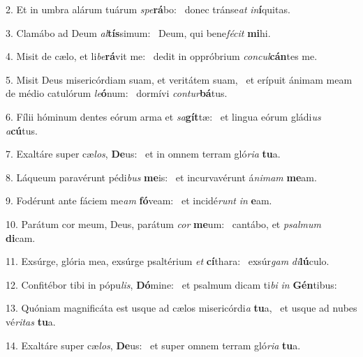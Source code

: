 2. Et in umbra alárum tuárum \textit{spe}\textbf{rá}bo: \ast\  donec tránse\textit{at} \textit{in}\textbf{í}quitas.\

3. Clamábo ad Deum \textit{al}\textbf{tís}simum: \ast\  Deum, qui bene\textit{fé}\textit{cit} \textbf{mi}hi.\

4. Misit de cælo, et li\textit{be}\textbf{rá}vit me: \ast\  dedit in oppróbrium \textit{con}\textit{cul}\textbf{cán}tes me.\

5. Misit Deus misericórdiam suam, et veritátem suam, \dag\  et erípuit ánimam meam de médio catulórum \textit{le}\textbf{ó}num: \ast\  dormívi \textit{con}\textit{tur}\textbf{bá}tus.\

6. Fílii hóminum dentes eórum arma et \textit{sa}\textbf{gít}tæ: \ast\  et lingua eórum gládi\textit{us} \textit{a}\textbf{cú}tus.\

7. Exaltáre super cæ\textit{los}, \textbf{De}us: \ast\  et in omnem terram gló\textit{ri}\textit{a} \textbf{tu}a.\

8. Láqueum paravérunt pédi\textit{bus} \textbf{me}is: \ast\  et incurvavérunt á\textit{ni}\textit{mam} \textbf{me}am.\

9. Fodérunt ante fáciem me\textit{am} \textbf{fó}veam: \ast\  et incidé\textit{runt} \textit{in} \textbf{e}am.\

10. Parátum cor meum, Deus, parátum \textit{cor} \textbf{me}um: \ast\  cantábo, et \textit{psal}\textit{mum} \textbf{di}cam.\

11. Exsúrge, glória mea, exsúrge psaltérium \textit{et} \textbf{cí}thara: \ast\  exsúr\textit{gam} \textit{di}\textbf{lú}culo.\

12. Confitébor tibi in pópu\textit{lis}, \textbf{Dó}mine: \ast\  et psalmum dicam ti\textit{bi} \textit{in} \textbf{Gén}tibus:\

13. Quóniam magnificáta est usque ad cælos misericórdi\textit{a} \textbf{tu}a, \ast\  et usque ad nubes vé\textit{ri}\textit{tas} \textbf{tu}a.\

14. Exaltáre super cæ\textit{los}, \textbf{De}us: \ast\  et super omnem terram gló\textit{ri}\textit{a} \textbf{tu}a.\

